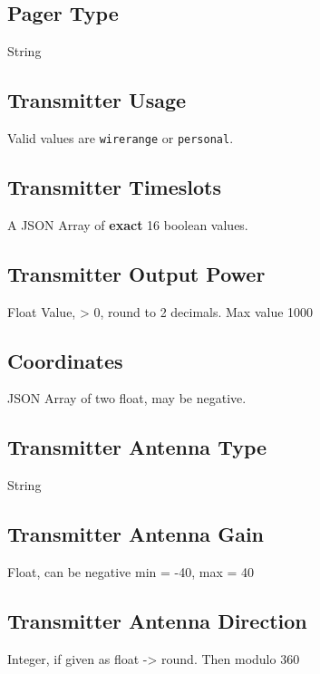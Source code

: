 \subsection{Pager Type}
\label{protocoldef:inputvalidation:pagertype}
String

\subsection{Transmitter Usage}
\label{protocoldef:inputvalidation:usage}
Valid values are \verb|wirerange| or \verb|personal|.

\subsection{Transmitter Timeslots}
\label{protocoldef:inputvalidation:timeslots}
A JSON Array of \textbf{exact} 16 boolean values.

\subsection{Transmitter Output Power}
\label{protocoldef:inputvalidation:power}
Float Value, > 0, round to 2 decimals. Max value 1000

\subsection{Coordinates}
\label{protocoldef:inputvalidation:coordinates}
JSON Array of two float, may be negative.

\subsection{Transmitter Antenna Type}
\label{protocoldef:inputvalidation:antennatype}
String

\subsection{Transmitter Antenna Gain}
\label{protocoldef:inputvalidation:antennagain}
Float, can be negative min = -40, max = 40

\subsection{Transmitter Antenna Direction}
\label{protocoldef:inputvalidation:antennadirection}
Integer, if given as float -> round. Then modulo 360

